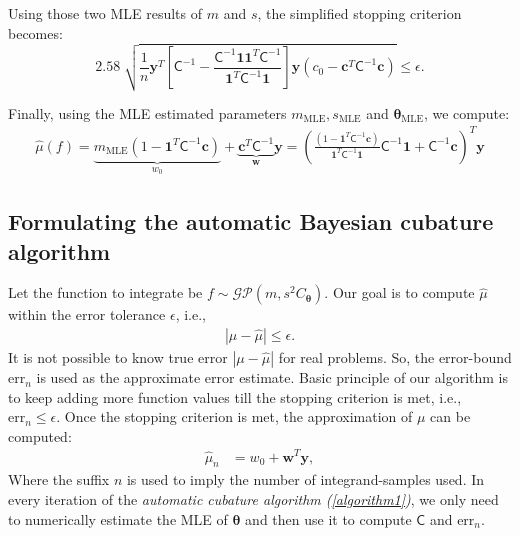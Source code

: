 \documentclass[smallextended]{svjour3}       %
\newcommand{\bm}[1]{\boldsymbol{#1}}
\newcommand{\vtheta}{{\bm{\theta}}}
\newcommand{\vthetaMLE}{\bm{\theta}_{\text{MLE}}}
\newcommand{\vc}{\bm{c}}
\newcommand{\vw}{\bm{w}}
\newcommand{\vy}{\bm{y}}
\newcommand{\vone}{\bm{1}}
\newcommand{\mC}{\mathsf{C}}
\newcommand{\mCInv}{{\mathsf{C}^{-1}}}
\newcommand{\hmu}{\hat{\mu}}
\newcommand{\MLE}{\text{MLE}}
\newcommand{\errtol}{\epsilon}
\newcommand{\errn}{\text{err}_{n}}
\newenvironment{nalign}{
    \begin{equation}
    \begin{aligned}
}{
    \end{aligned}
    \end{equation}
    \ignorespacesafterend
}
\begin{document}
Using those two MLE results of $m$ and $s$, the simplified stopping criterion becomes:
\[
2.58 \; \sqrt{ 
\frac{1}{n}
\vy^T 
\left[ 
\mCInv - 
\frac{ \mCInv \vone \vone^T \mCInv }{\vone^T\mCInv \vone}
\right] \vy
(c_0 - \vc^T\mC^{-1}\vc) }  \leq \errtol .
\]

Finally, using the MLE estimated parameters $m_\MLE , s_\MLE$ and $\vthetaMLE$, we compute:
\begin{align*}
\hmu(f) = 
\underbrace{ m_\MLE(1 - \vone^T  \mC^{-1}\vc )}_{w_0}
+
\underbrace{\vc^T \mC^{-1}}_{\vw} \vy 
=
\left(
\frac{ (1 - \vone^T  \mCInv\vc ) }{ \vone^T \mCInv \vone}   \mCInv \vone +  \mCInv\vc 
\right)^T \vy
\end{align*}































\subsection{Formulating the automatic Bayesian cubature algorithm}
\label{sec:bayes_cubature_algo}
Let the function to integrate be $f \sim \mathcal{GP}(m,s^2 C_\vtheta)$.
Our goal is to compute $\hat{\mu}$ within the error tolerance $\errtol$, i.e.,
\begin{align*}
|\mu - \hat{\mu}| \leq \errtol.
\end{align*}
It is not possible to know true error $|\mu - \hat{\mu}|$ for real problems. So, the error-bound $\errn$ is used as the approximate error estimate.
Basic principle of our algorithm is to keep adding more function values till the stopping criterion is met, i.e., $\errn \le \errtol$. 
Once the stopping criterion is met, the approximation of $\mu$ can be computed:
\begin{nalign}
\label{eqn_muhat}
\hmu_n &= w_0 + \vw^T \vy,
\end{nalign}
Where the suffix $n$ is used to imply the number of integrand-samples used. In every iteration of the \emph{automatic cubature algorithm (\ref{algorithm1})}, we only need to numerically estimate the MLE of $\vtheta$ and then use it to compute $\mC$ and $\errn$. 
\end{document}
